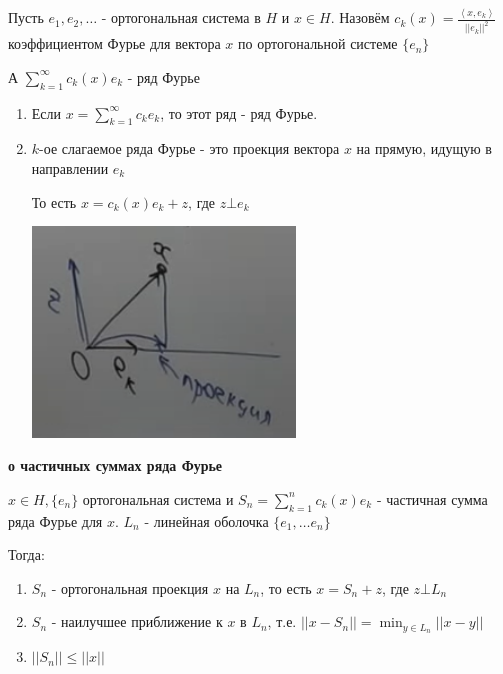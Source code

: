 \begin{definition}
    Пусть $e_1, e_2, \ldots$ - ортогональная система в $H$ и $x \in H$. Назовём $c_k (x) = \frac{\left < x, e_k \right >}{||e_k||^2}$ коэффициентом Фурье для вектора $x$ по ортогональной системе $\{ e_n \}$

    А $\sum_{k = 1}^\infty c_k (x) e_k $ - ряд Фурье
\end{definition}

\begin{remark}
    \begin{enumerate}
        \item {
            Если $x = \sum_{k = 1}^\infty c_k e_k$, то этот ряд - ряд Фурье.
        }
        \item {
            $k$-ое слагаемое ряда Фурье - это проекция вектора $x$ на прямую, идущую в направлении $e_k$

            То есть $x = c_k(x) e_k + z$, где $z \bot e_k$

            \begin{center}
                \includegraphics[width=7cm]{./assets/05-fourierreihe/projection-of-x.png}
            \end{center}
        }
    \end{enumerate}
\end{remark}

\begin{theorem}
    \textbf{о частичных суммах ряда Фурье}

    $x \in H, \{ e_n \}$ ортогональная система и $S_n = \sum_{k = 1}^n c_k (x) e_k $ - частичная сумма ряда Фурье для $x$.
    $L_n$ - линейная оболочка $\{ e_1, \ldots e_n \}$

    Тогда:
    \begin{enumerate}
        \item $S_n$ - ортогональная проекция $x$ на $L_n$, то есть $x = S_n + z$, где $z \bot L_n$
        \item $S_n$ - наилучшее приближение к $x$ в $L_n$, т.е. $||x - S_n|| = \min_{y \in L_n} ||x - y||$
        \item $||S_n|| \leqslant ||x||$
    \end{enumerate}

\end{theorem}

